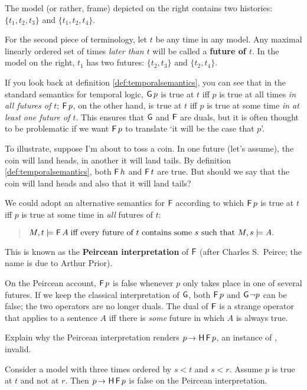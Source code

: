 \noindent
The model (or rather, frame) depicted on the right contains two
histories: $\{ t_1, t_2, t_3 \}$ and $\{ t_1, t_2, t_4 \}$.

For the second piece of terminology, let $t$ be any time in any model. Any
maximal linearly ordered set of times \emph{later than $t$} will be called a
\textbf{future of $t$}. In the model on the right, $t_1$ has two futures:
$\{ t_2, t_3 \}$ and $\{ t_2, t_4 \}$.

If you look back at definition \ref{def:temporalsemantics}, you can see that in
the standard semantics for temporal logic, $\operatorname{\mathsf{G}} p$ is true at $t$ iff $p$ is
true at all times \emph{in all futures of $t$}; $\operatorname{\mathsf{F}} p$, on the other hand, is
true at $t$ iff $p$ is true at some time \emph{in at least one future of $t$}.
This ensures that $\operatorname{\mathsf{G}}$ and $\operatorname{\mathsf{F}}$ are duals, but it is often thought to be
problematic if we want $\operatorname{\mathsf{F}} p$ to translate `it will be the case that $p$'.

To illustrate, suppose I'm about to toss a coin. In one future (let's assume),
the coin will land heads, in another it will land tails. By definition
\ref{def:temporalsemantics}, both $\operatorname{\mathsf{F}} h$ and $\operatorname{\mathsf{F}} t$ are true. But should we
say that the coin will land heads and also that it will land tails?


We could adopt an alternative semantics for $\operatorname{\mathsf{F}}$ according to which $\operatorname{\mathsf{F}} p$
is true at $t$ iff $p$ is true at some time in \emph{all} futures of $t$:
%
\begin{quote}
  $M,t \models \tF A \;\text{iff every future of $t$ contains some $s$ such that $M,s \models A$}.$
\end{quote}
This is known as the \textbf{Peircean interpretation} of $\operatorname{\mathsf{F}}$ (after
Charles S.\ Peirce; the name is due to Arthur Prior).

On the Peircean account, $\operatorname{\mathsf{F}} p$ is false whenever $p$ only takes place in one
of several futures. If we keep the classical interpretation of $\operatorname{\mathsf{G}}$, both
$\operatorname{\mathsf{F}} p$ and $\operatorname{\mathsf{G}} \neg p$ can be false; the two operators are no longer duals.
The dual of $\operatorname{\mathsf{F}}$ is a strange operator that applies to a sentence $A$ iff there
is \emph{some} future in which $A$ is always true.

\begin{exercise}
  Explain why the Peircean interpretation renders $p \to \tH\tF p$, an instance
  of , invalid.
\end{exercise}
\begin{solution}
  Consider a model with three times ordered by $s<t$ and $s<r$. Assume $p$ is true at $t$ and not at $r$. Then $p \to \tH\tF p$ is false on the Peircean interpretation.
\end{solution}

